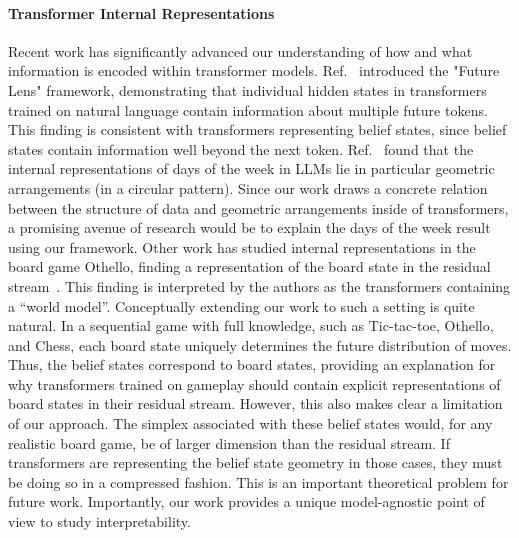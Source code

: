 \documentclass{article}
\begin{document}
\paragraph{Transformer Internal Representations}
Recent work has significantly advanced our understanding of how and what information is encoded within transformer models. Ref.~\citep{Pal23_Future} introduced the "Future Lens" framework, demonstrating that individual hidden states in transformers trained on natural language contain information about multiple future tokens. This finding is consistent with transformers representing belief states, since belief states contain information well beyond the next token. Ref.~\citep{engels2024not} found that the internal representations of days of the week in LLMs lie in particular geometric arrangements (in a circular pattern). Since our work draws a concrete relation between the structure of data and geometric arrangements inside of transformers, a promising avenue of research would be to explain the days of the week result using our framework.
Other work has studied internal representations in the board game Othello, finding a representation of the board state in the residual stream~\cite{li2022emergent, nanda2023emergent}. This finding is interpreted by the authors as the transformers containing a “world model”. Conceptually extending our work to such a setting is quite natural. In a sequential game with full knowledge, such as Tic-tac-toe, Othello, and Chess, each board state uniquely determines the future distribution of moves. Thus, the belief states correspond to board states, providing an explanation for why transformers trained on gameplay should contain explicit representations of board states in their residual stream. 
However, this also makes clear a limitation of our approach. The simplex associated with these belief states would, for any realistic board game, be of larger dimension than the residual stream. If transformers are representing the belief state geometry in those cases, they must be doing so in a compressed fashion. This is an important theoretical problem for future work. Importantly, our work provides a unique model-agnostic point of view to study interpretability.
\end{document}

